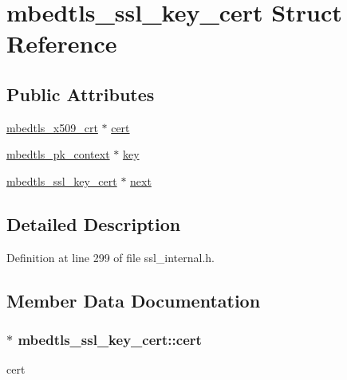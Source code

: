 \hypertarget{structmbedtls__ssl__key__cert}{\section{mbedtls\-\_\-ssl\-\_\-key\-\_\-cert Struct Reference}
\label{structmbedtls__ssl__key__cert}
}
\subsection*{Public Attributes}
\begin{DoxyCompactItemize}
\item 
\hyperlink{structmbedtls__x509__crt}{mbedtls\-\_\-x509\-\_\-crt} $\ast$ \hyperlink{structmbedtls__ssl__key__cert_a85f7a889f740577ad11cd50adbef09a8}{cert}
\item 
\hyperlink{structmbedtls__pk__context}{mbedtls\-\_\-pk\-\_\-context} $\ast$ \hyperlink{structmbedtls__ssl__key__cert_a36357248c58a208bf8e820b75f2f118f}{key}
\item 
\hyperlink{structmbedtls__ssl__key__cert}{mbedtls\-\_\-ssl\-\_\-key\-\_\-cert} $\ast$ \hyperlink{structmbedtls__ssl__key__cert_ac8969b0a63df001f997cab96154db160}{next}
\end{DoxyCompactItemize}


\subsection{Detailed Description}


Definition at line 299 of file ssl\-\_\-internal.\-h.



\subsection{Member Data Documentation}
\hypertarget{structmbedtls__ssl__key__cert_a85f7a889f740577ad11cd50adbef09a8}{
\subsubsection[{cert}]{$\ast$ mbedtls\-\_\-ssl\-\_\-key\-\_\-cert\-::cert}}\label{structmbedtls__ssl__key__cert_a85f7a889f740577ad11cd50adbef09a8}
cert 

